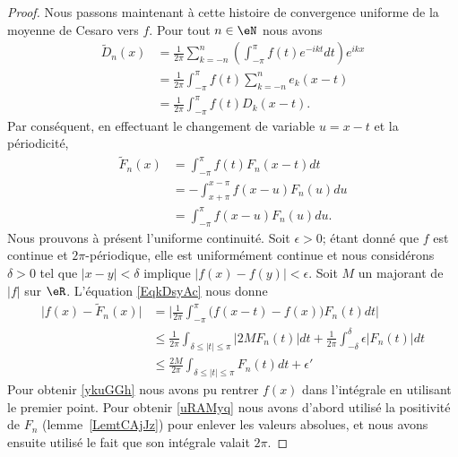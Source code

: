 \begin{proof}
    Nous passons maintenant à cette histoire de convergence uniforme de la moyenne de Cesaro vers \( f\). Pour tout \( n\in \eN\) nous avons
    \begin{subequations}
        \begin{align}
            \tilde  D_n(x)&=\frac{1}{ 2\pi }\sum_{k=-n}^n\left( \int_{-\pi}^{\pi}f(t) e^{-ikt}dt \right) e^{ikx}\\
            &=\frac{1}{ 2\pi }\int_{-\pi}^{\pi}f(t)\sum_{k=-n}^ne_k(x-t)\\
            &=\frac{1}{ 2\pi }\int_{-\pi}^{\pi}f(t)D_k(x-t).
        \end{align}
    \end{subequations}
    Par conséquent, en effectuant le changement de variable \( u=x-t\) et la périodicité,
    \begin{subequations}    \label{EqkDsyAc}
        \begin{align}
            \tilde F_n(x)&=\int_{-\pi}^{\pi}f(t)F_n(x-t)dt\\
            &=-\int_{x+\pi}^{x-\pi}f(x-u)F_n(u)du\\
            &=\int_{-\pi}^{\pi}f(x-u) F_n(u)du.
        \end{align}
    \end{subequations}
    Nous prouvons à présent l'uniforme continuité. Soit \( \epsilon>0\); étant donné que \( f\) est continue et \( 2\pi\)-périodique, elle est uniformément continue et nous considérons \( \delta>0\) tel que \( | x-y |<\delta\) implique \( \big| f(x)-f(y) \big|<\epsilon\). Soit \( M\) un majorant de \( | f |\) sur \( \eR\). L'équation \eqref{EqkDsyAc} nous donne
    \begin{subequations}
        \begin{align}
            \big| f(x)-\tilde F_n(x) \big|&=\big| \frac{1}{ 2\pi }\int_{-\pi}^{\pi}\big( f(x-t)-f(x) \big)F_n(t)dt \big|    \label{ykuGGh}\\
            &\leq\frac{1}{ 2\pi }\int_{\delta\leq| t |\leq \pi}| 2MF_n(t) |dt+\frac{1}{ 2\pi }\int_{-\delta}^{\delta}\epsilon| F_n(t) |dt\\
            &\leq\frac{ 2M }{ 2\pi }\int_{\delta\leq | t |\leq\pi}F_n(t)dt+\epsilon'    \label{uRAMyq}
        \end{align}
    \end{subequations}
    Pour obtenir \eqref{ykuGGh} nous avons pu rentrer \( f(x)\) dans l'intégrale en utilisant le premier point. Pour obtenir \eqref{uRAMyq} nous avons d'abord utilisé la positivité de \( F_n\) (lemme~\ref{LemtCAjJz}) pour enlever les valeurs absolues, et nous avons ensuite utilisé le fait que son intégrale valait \( 2\pi\).


\end{proof}
